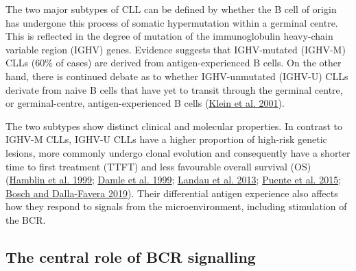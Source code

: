 \documentclass[11pt, a4paper, twosided]{book}
\begin{document}
The two major subtypes of CLL can be defined by whether the B cell of origin has undergone this process of somatic hypermutation within a germinal centre. This is reflected in the degree of mutation of the immunoglobulin heavy-chain variable region (IGHV) genes. Evidence suggests that IGHV-mutated (IGHV-M) CLLs (60\% of cases) are derived from antigen-experienced B cells. On the other hand, there is continued debate as to whether IGHV-unmutated (IGHV-U) CLLs derivate from naive B cells that have yet to transit through the germinal centre, or germinal-centre, antigen-experienced B cells (\protect\hyperlink{ref-Klein2001}{Klein et al. 2001}).

The two subtypes show distinct clinical and molecular properties. In contrast to IGHV-M CLLs, IGHV-U CLLs have a higher proportion of high-risk genetic lesions, more commonly undergo clonal evolution and consequently have a shorter time to first treatment (TTFT) and less favourable overall survival (OS) (\protect\hyperlink{ref-Hamblin1999}{Hamblin et al. 1999}; \protect\hyperlink{ref-Damle1999}{Damle et al. 1999}; \protect\hyperlink{ref-Landau2013}{Landau et al. 2013}; \protect\hyperlink{ref-Puente2015}{Puente et al. 2015}; \protect\hyperlink{ref-Bosch2019}{Bosch and Dalla-Favera 2019}). Their differential antigen experience also affects how they respond to signals from the microenvironment, including stimulation of the BCR.

\hypertarget{intro-bcr-signalling}{%
\subsection{The central role of BCR signalling}\label{intro-bcr-signalling}}
\end{document}
